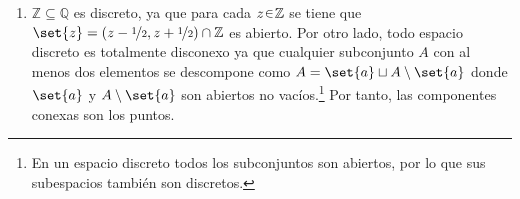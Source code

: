 \begin{sol}[Demostración]
\begin{enumerate}[label = (\alph*)]
    Por otro lado, es evidente que $\mathbb{Q}$ no es discreto, pues los abiertos no vacíos de $\mathbb{Q}$ contienen un intervalo racional $(a, b) \cap \mathbb{Q}$ con $a < b$, el cual ---por densidad de $\mathbb{Q}$--- tiene infinitos elementos. Se sigue que los puntos no pueden ser abiertos ya que no pueden contener un subconjunto infinito. Esto prueba que $\mathbb{Q}$ no es discreto.

    \item $\mathbb{Z} \subseteq \mathbb{Q}$ es discreto, ya que para cada $z \en \mathbb{Z}$ se tiene que $\set{z} = (z - \nicefrac12, z + \nicefrac12) \cap \mathbb{Z}$ es abierto. Por otro lado, todo espacio discreto es totalmente disconexo ya que cualquier subconjunto $A$ con al menos dos elementos se descompone como $A = \set{a} \sqcup A\setminus\set{a}$ donde $\set{a}$ y $A\setminus\set{a}$ son abiertos no vacíos.\footnote{En un espacio discreto todos los subconjuntos son abiertos, por lo que sus subespacios también son discretos.} Por tanto, las componentes conexas son los puntos.


\end{enumerate}
\end{sol}
